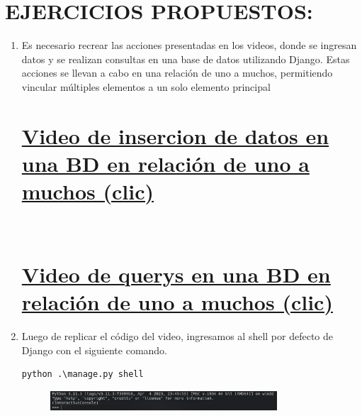 \documentclass{article}
\begin{document}
  \section{EJERCICIOS PROPUESTOS:}
\begin{enumerate}
  \item Es necesario recrear las acciones presentadas en los videos, donde se ingresan datos y se realizan consultas en una base de datos utilizando Django. Estas acciones se llevan a cabo en una relación de uno a muchos, permitiendo vincular múltiples elementos a un solo elemento principal
\setcounter{secnumdepth}{0}
\section{\normalfont\small\href{https://drive.google.com/file/d/1NxYCU2yBtF7KXXwB2iiNtx_zD5NMiTTF/view}{Video de insercion de datos en una BD en relación de uno a muchos (clic)}}\\
\section{\normalfont\small\href{https://drive.google.com/file/d/1H1uLOHR2qHNH3VcZUd9JpqcACqX0UpoM/view}{Video de querys en una BD en relación de uno a muchos (clic)}}


  \item Luego de replicar el código del video, ingresamos al shell por defecto de Django con el siguiente comando.
\begin{lstlisting}
python .\manage.py shell
\end{lstlisting}
\begin{figure}[H]
		\centering
		\includegraphics[width=0.8\textwidth,keepaspectratio]{img/Ejercicio1/1.png}
	\end{figure}


\end{enumerate}
\end{document}
